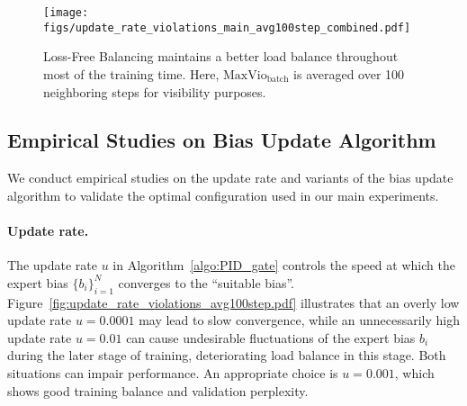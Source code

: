 \documentclass{article} %
\newcommand{\Ours}{Loss-Free Balancing}
\begin{document}
\begin{figure}[t]
  \centering
    \texttt{[image: figs/update\_rate\_violations\_main\_avg100step\_combined.pdf]}
\caption{\Ours{} maintains a better load balance throughout most of the training time. Here, $\text{MaxVio}_\text{batch}$ is averaged over 100 neighboring steps for visibility purposes.}
\label{fig:update_rate_violations_main_avg100step_combined.pdf}
\end{figure}

\subsection{Empirical Studies on Bias Update Algorithm} %
\label{sec:empirical_study}

We conduct empirical studies on the update rate and variants of the bias update algorithm to validate the optimal configuration used in our main experiments. 

\paragraph{Update rate.} 
The update rate $u$ in Algorithm~\ref{algo:PID_gate} controls the speed at which the expert bias $\{{b}_i\}_{i=1}^N$ converges to the ``suitable bias''. Figure~\ref{fig:update_rate_violations_avg100step.pdf} illustrates that an overly low update rate $u=0.0001$ may lead to slow convergence, while an unnecessarily high update rate $u=0.01$ can cause undesirable fluctuations of the expert bias ${b}_i$ during the later stage of training, deteriorating load balance in this stage. Both situations can impair performance. An appropriate choice is $u=0.001$, which shows good training balance and validation perplexity.%


\end{document}
